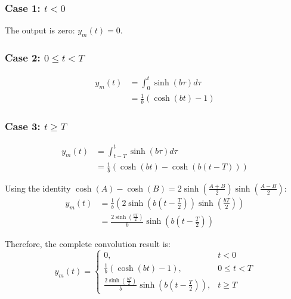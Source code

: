 	\subsubsection{Case 1: $t < 0$}
	The output is zero: $y_m(t) = 0$.
	
	\subsubsection{Case 2: $0 \leq t < T$}
	\begin{align}
		y_m(t) &= \int_{0}^{t} \sinh(b\tau) d\tau \\
		&= \frac{1}{b}(\cosh(bt) - 1)
	\end{align}
	
	\subsubsection{Case 3: $t \geq T$}
	\begin{align}
		y_m(t) &= \int_{t-T}^{t} \sinh(b\tau) d\tau \\
		&= \frac{1}{b}(\cosh(bt) - \cosh(b(t-T)))
	\end{align}
	
	Using the identity $\cosh(A) - \cosh(B) = 2\sinh(\frac{A+B}{2})\sinh(\frac{A-B}{2})$:
	\begin{align}
		y_m(t) &= \frac{1}{b}(2\sinh(b(t-\frac{T}{2}))\sinh(\frac{bT}{2})) \\
		&= \frac{2\sinh(\frac{bT}{2})}{b}\sinh(b(t-\frac{T}{2}))
	\end{align}
	
	Therefore, the complete convolution result is:
	\begin{equation}
		y_m(t) = 
		\begin{cases} 
			0, & t < 0 \\
			\frac{1}{b}(\cosh(bt) - 1), & 0 \leq t < T \\
			\frac{2\sinh(\frac{bT}{2})}{b}\sinh(b(t-\frac{T}{2})), & t \geq T
		\end{cases}
	\end{equation}
	
